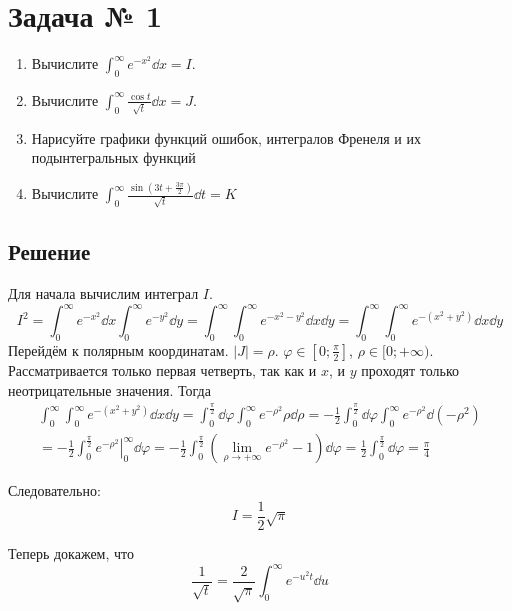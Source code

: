 \section{Задача № 1}

\begin{enumerate}
\item Вычислите \(\int_{0}^{\infty} e^{-x^2} \dd x = I\).
\item Вычислите \(\int_{0}^{\infty} \frac{\cos t}{\sqrt{t}} \dd x = J\).
\item Нарисуйте графики функций ошибок, интегралов Френеля
  и их подынтегральных функций
\item Вычислите
  \(\int_{0}^{\infty} \frac{\sin(3t + \frac{3\pi}{2})}{\sqrt{t}} \dd t = K\)
\end{enumerate}

\subsection{Решение}

Для начала вычислим интеграл \(I\).
\[
  I^2 = \int_{0}^{\infty} e^{-x^2} \dd x \int_{0}^{\infty} e^{-y^2} \dd y
  = \int_{0}^{\infty} \int_{0}^{\infty} e^{-x^2-y^2} \dd x \dd y
  = \int_{0}^{\infty} \int_{0}^{\infty} e^{-(x^2+y^2)} \dd x \dd y
\]
Перейдём к полярным координатам. \(|J| = \rho\).
\(\varphi \in [0; \frac{\pi}{2}]\), \(\rho \in [0;+\infty)\).
Рассматривается только первая четверть, так как и \(x\), и \(y\)
проходят только неотрицательные значения.
Тогда
\[
\begin{split}
  \int_{0}^{\infty} \int_{0}^{\infty} e^{-(x^2+y^2)} \dd x \dd y
  = \int_{0}^{\frac{\pi}{2}} \dd \varphi \int_{0}^{\infty} e^{-\rho^2} \rho \dd \rho
  = -\frac{1}{2} \int_{0}^{\frac{\pi}{2}} \dd \varphi \int_{0}^{\infty} e^{-\rho^2} \dd(-\rho^2) \\
  = -\frac{1}{2} \int_{0}^{\frac{\pi}{2}} \left. e^{-\rho^2}\right\rvert_{0}^{\infty}\dd \varphi
  = -\frac{1}{2} \int_{0}^{\frac{\pi}{2}}
    \left( \lim_{\rho \to +\infty} e^{-\rho^2} - 1 \right) \dd \varphi
  = \frac{1}{2} \int_{0}^{\frac{\pi}{2}} \dd \varphi
  = \frac{\pi}{4}
\end{split}
\]

Следовательно:
\[ I = \frac{1}{2}\sqrt{\pi} \]

Теперь докажем, что
\begin{equation}\label{eq:01-sqrtt}
  \frac{1}{\sqrt{t}} = \frac{2}{\sqrt{\pi}} \int_{0}^{\infty} e^{-u^2 t} \dd u
\end{equation}


